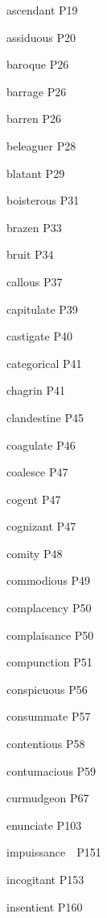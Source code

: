 \documentclass[12pt, a4paper, twocolumn]{article}
\begin{document}
    ascendant \hfill P19 

    assiduous \hfill P20 

    baroque \hfill P26 

    barrage \hfill P26 

    barren \hfill P26 

    beleaguer \hfill P28 

    blatant \hfill P29 

    boisterous \hfill P31

    brazen \hfill P33
    
    bruit \hfill P34

    callous \hfill P37 

    capitulate \hfill P39 

    castigate \hfill P40 

    categorical \hfill P41 

    chagrin \hfill P41 

    clandestine \hfill P45 

    coagulate \hfill P46 

    coalesce \hfill P47 
    
    cogent \hfill P47

    cognizant \hfill P47 

    comity \hfill P48 

    commodious \hfill P49 

    complacency \hfill P50 

    complaisance \hfill P50 

    compunction \hfill P51 

    conspicuous \hfill P56 

    consummate \hfill P57

    contentious \hfill P58

    contumacious \hfill P59 

    curmudgeon \hfill P67

    enunciate \hfill P103  

    impuissance　\hfill P151


    incogitant  \hfill P153

    insentient \hfill P160
\end{document}

